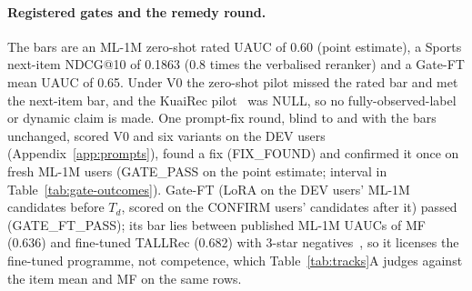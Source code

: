 \paragraph{Registered gates and the remedy round.}
The bars are an ML-1M zero-shot rated UAUC of 0.60 (point estimate), a Sports next-item NDCG@10 of 0.1863 (0.8 times the verbalised
reranker) and a Gate-FT mean UAUC of 0.65. Under V0 the zero-shot pilot missed the rated bar and met the next-item bar, and the KuaiRec
pilot~\citep{gao2022kuairec} was NULL, so no fully-observed-label or dynamic claim is made. One prompt-fix round, blind to \method{}
and with the bars unchanged, scored V0 and six variants on the DEV users (Appendix~\ref{app:prompts}), found a fix (FIX\_FOUND) and
confirmed it once on fresh ML-1M users (GATE\_PASS on the point estimate; interval in Table~\ref{tab:gate-outcomes}). Gate-FT (LoRA on
the DEV users' ML-1M candidates before $T_d$, scored on the CONFIRM users' candidates after it) passed (GATE\_FT\_PASS); its bar lies
between published ML-1M UAUCs of MF (0.636) and fine-tuned TALLRec (0.682) with 3-star negatives~\citep{zhang2025collm}, so it licenses
the fine-tuned programme, not competence, which Table~\ref{tab:tracks}A judges against the item mean and MF on the same rows.
\begin{table}[!htbp]
\caption{Registered gates of the remedy round and Gate-FT (DEV: 1,500 users per panel; CONFIRM:  fresh ML-1M
users, Gate-FT on their candidates after $T_d$; the pilot outcomes are in the text).}
\label{tab:gate-outcomes}
\centering\scriptsize\setlength{\tabcolsep}{3pt}\renewcommand{\arraystretch}{0.9}
\end{table}

